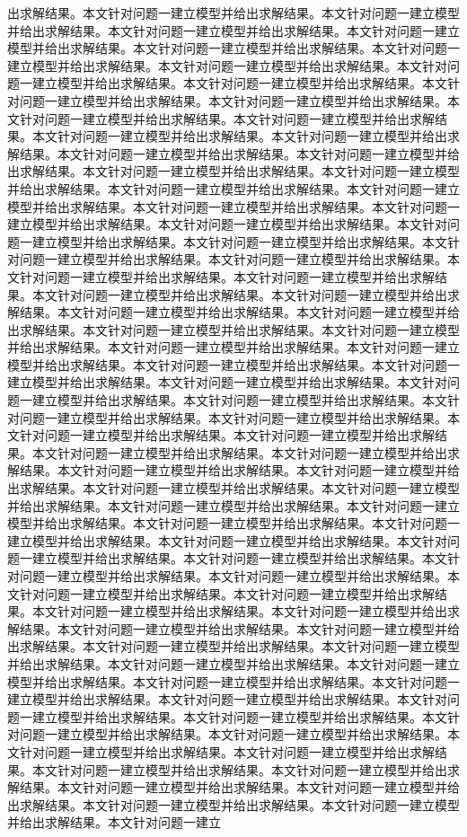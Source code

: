 出求解结果。本文针对问题一建立模型并给出求解结果。本文针对问题一建立模型并给出求解结果。本文针对问题一建立模型并给出求解结果。本文针对问题一建立模型并给出求解结果。本文针对问题一建立模型并给出求解结果。本文针对问题一建立模型并给出求解结果。本文针对问题一建立模型并给出求解结果。本文针对问题一建立模型并给出求解结果。本文针对问题一建立模型并给出求解结果。本文针对问题一建立模型并给出求解结果。本文针对问题一建立模型并给出求解结果。本文针对问题一建立模型并给出求解结果。本文针对问题一建立模型并给出求解结果。本文针对问题一建立模型并给出求解结果。本文针对问题一建立模型并给出求解结果。本文针对问题一建立模型并给出求解结果。本文针对问题一建立模型并给出求解结果。本文针对问题一建立模型并给出求解结果。本文针对问题一建立模型并给出求解结果。本文针对问题一建立模型并给出求解结果。本文针对问题一建立模型并给出求解结果。本文针对问题一建立模型并给出求解结果。本文针对问题一建立模型并给出求解结果。本文针对问题一建立模型并给出求解结果。本文针对问题一建立模型并给出求解结果。本文针对问题一建立模型并给出求解结果。本文针对问题一建立模型并给出求解结果。本文针对问题一建立模型并给出求解结果。本文针对问题一建立模型并给出求解结果。本文针对问题一建立模型并给出求解结果。本文针对问题一建立模型并给出求解结果。本文针对问题一建立模型并给出求解结果。本文针对问题一建立模型并给出求解结果。本文针对问题一建立模型并给出求解结果。本文针对问题一建立模型并给出求解结果。本文针对问题一建立模型并给出求解结果。本文针对问题一建立模型并给出求解结果。本文针对问题一建立模型并给出求解结果。本文针对问题一建立模型并给出求解结果。本文针对问题一建立模型并给出求解结果。本文针对问题一建立模型并给出求解结果。本文针对问题一建立模型并给出求解结果。本文针对问题一建立模型并给出求解结果。本文针对问题一建立模型并给出求解结果。本文针对问题一建立模型并给出求解结果。本文针对问题一建立模型并给出求解结果。本文针对问题一建立模型并给出求解结果。本文针对问题一建立模型并给出求解结果。本文针对问题一建立模型并给出求解结果。本文针对问题一建立模型并给出求解结果。本文针对问题一建立模型并给出求解结果。本文针对问题一建立模型并给出求解结果。本文针对问题一建立模型并给出求解结果。本文针对问题一建立模型并给出求解结果。本文针对问题一建立模型并给出求解结果。本文针对问题一建立模型并给出求解结果。本文针对问题一建立模型并给出求解结果。本文针对问题一建立模型并给出求解结果。本文针对问题一建立模型并给出求解结果。本文针对问题一建立模型并给出求解结果。本文针对问题一建立模型并给出求解结果。本文针对问题一建立模型并给出求解结果。本文针对问题一建立模型并给出求解结果。本文针对问题一建立模型并给出求解结果。本文针对问题一建立模型并给出求解结果。本文针对问题一建立模型并给出求解结果。本文针对问题一建立模型并给出求解结果。本文针对问题一建立模型并给出求解结果。本文针对问题一建立模型并给出求解结果。本文针对问题一建立模型并给出求解结果。本文针对问题一建立模型并给出求解结果。本文针对问题一建立模型并给出求解结果。本文针对问题一建立模型并给出求解结果。本文针对问题一建立模型并给出求解结果。本文针对问题一建立模型并给出求解结果。本文针对问题一建立模型并给出求解结果。本文针对问题一建立模型并给出求解结果。本文针对问题一建立模型并给出求解结果。本文针对问题一建立模型并给出求解结果。本文针对问题一建立模型并给出求解结果。本文针对问题一建立模型并给出求解结果。本文针对问题一建立模型并给出求解结果。本文针对问题一建立模型并给出求解结果。本文针对问题一建立模型并给出求解结果。本文针对问题一建立模型并给出求解结果。本文针对问题一建立模型并给出求解结果。本文针对问题一建立模型并给出求解结果。本文针对问题一建立